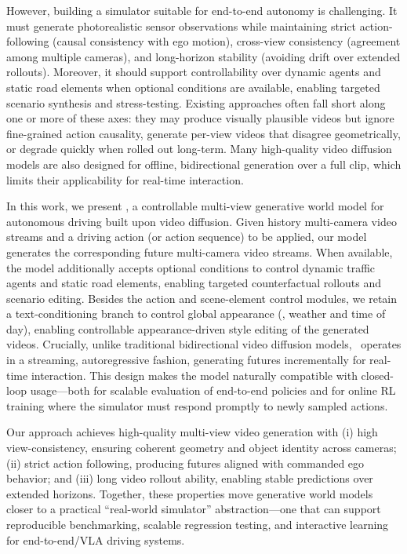However, building a simulator suitable for end-to-end autonomy is challenging. It must generate photorealistic sensor observations while maintaining strict action-following (causal consistency with ego motion), cross-view consistency (agreement among multiple cameras), and long-horizon stability (avoiding drift over extended rollouts). Moreover, it should support controllability over dynamic agents and static road elements when optional conditions are available, enabling targeted scenario synthesis and stress-testing. Existing approaches often fall short along one or more of these axes: they may produce visually plausible videos but ignore fine-grained action causality, generate per-view videos that disagree geometrically, or degrade quickly when rolled out long-term. Many high-quality video diffusion models are also designed for offline, bidirectional generation over a full clip, which limits their applicability for real-time interaction.

In this work, we present \textbf{\modelname}, a controllable multi-view generative world model for autonomous driving built upon video diffusion. Given history multi-camera video streams and a driving action (or action sequence) to be applied, our model generates the corresponding future multi-camera video streams. When available, the model additionally accepts optional conditions to control dynamic traffic agents and static road elements, enabling targeted counterfactual rollouts and scenario editing. 
Besides the action and scene-element control modules, we retain a text-conditioning branch to control global appearance (\eg, weather and time of day), enabling controllable appearance-driven style editing of the generated videos.
Crucially, unlike traditional bidirectional video diffusion models, \modelname~operates in a streaming, autoregressive fashion, generating futures incrementally for real-time interaction. This design makes the model naturally compatible with closed-loop usage—both for scalable evaluation of end-to-end policies and for online RL training where the simulator must respond promptly to newly sampled actions.

Our approach achieves high-quality multi-view video generation with (i) high view-consistency, ensuring coherent geometry and object identity across cameras; (ii) strict action following, producing futures aligned with commanded ego behavior; and (iii) long video rollout ability, enabling stable predictions over extended horizons. Together, these properties move generative world models closer to a practical “real-world simulator” abstraction—one that can support reproducible benchmarking, scalable regression testing, and interactive learning for end-to-end/VLA driving systems.